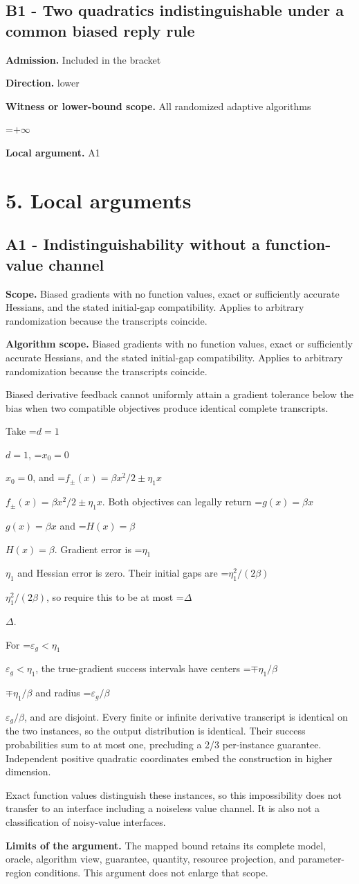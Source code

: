 \documentclass[10pt,a4paper]{article}
\newcommand{\AtlasMath}[1]{\par\begingroup\centering\setbox0=\hbox{$\displaystyle #1$}\ifdim\wd0>1.4\linewidth\typeout{ATLAS WIDE FORMULA: \the\wd0}\fi\ifdim\wd0>\linewidth\resizebox{\linewidth}{!}{\box0}\else\box0\fi\par\endgroup}
\newcommand{\AtlasInlineMath}[1]{\begingroup\setbox0=\hbox{$#1$}\ifdim\wd0>.4\linewidth\endgroup\AtlasMath{#1}\else\endgroup$#1$\fi}
\begin{document}
\subsection{B1 - Two quadratics indistinguishable under a common biased reply rule}
\textbf{Admission.} Included in the bracket

\textbf{Direction.} lower

\textbf{Witness or lower-bound scope.} All randomized adaptive algorithms

\AtlasMath{+\infty}
\textbf{Local argument.} A1

\section{5. Local arguments}
\subsection{A1 - Indistinguishability without a function-value channel}
\textbf{Scope.} Biased gradients with no function values, exact or sufficiently accurate Hessians, and the stated initial-gap compatibility. Applies to arbitrary randomization because the transcripts coincide.

\textbf{Algorithm scope.} Biased gradients with no function values, exact or sufficiently accurate Hessians, and the stated initial-gap compatibility. Applies to arbitrary randomization because the transcripts coincide.

Biased derivative feedback cannot uniformly attain a gradient tolerance below the bias when two compatible objectives produce identical complete transcripts.

Take \AtlasInlineMath{d=1}, \AtlasInlineMath{x_0=0}, and \AtlasInlineMath{f_\pm(x)=\beta x^2/2\pm\eta_1x}. Both objectives can legally return \AtlasInlineMath{g(x)=\beta x} and \AtlasInlineMath{H(x)=\beta}. Gradient error is \AtlasInlineMath{\eta_1} and Hessian error is zero. Their initial gaps are \AtlasInlineMath{\eta_1^2/(2\beta)}, so require this to be at most \AtlasInlineMath{\Delta}.

For \AtlasInlineMath{\varepsilon_g<\eta_1}, the true-gradient success intervals have centers \AtlasInlineMath{\mp\eta_1/\beta} and radius \AtlasInlineMath{\varepsilon_g/\beta}, and are disjoint. Every finite or infinite derivative transcript is identical on the two instances, so the output distribution is identical. Their success probabilities sum to at most one, precluding a 2/3 per-instance guarantee. Independent positive quadratic coordinates embed the construction in higher dimension.

Exact function values distinguish these instances, so this impossibility does not transfer to an interface including a noiseless value channel. It is also not a classification of noisy-value interfaces.

\textbf{Limits of the argument.} The mapped bound retains its complete model, oracle, algorithm view, guarantee, quantity, resource projection, and parameter-region conditions. This argument does not enlarge that scope.
\end{document}
